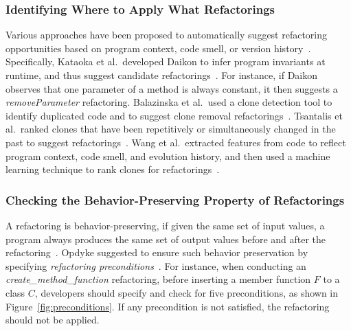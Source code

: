 \documentclass[runningheads,a4paper]{llncs}
\begin{document}
\subsubsection{Identifying Where to Apply What Refactorings}
Various approaches have been proposed to automatically suggest refactoring opportunities based on program context, code smell, or version history~\cite{Balazinska2000:ACA,Kataoka2001:ASP,Higo2008:metricrefactoring,Tsantalis2011:rankRefactoring,Wang2014:recommendClones,Meng2015:ARO}. Specifically, Kataoka et al.~developed Daikon to infer program invariants at runtime, and thus suggest candidate refactorings~\cite{Kataoka2001:ASP}. For instance, if Daikon observes that one parameter of a method is always constant, it then suggests a \emph{removeParameter} refactoring. Balazinska et al.~used a clone detection tool to identify duplicated code and to suggest clone removal refactorings~\cite{Balazinska2000:ACA}. Tsantalis et al.~ranked clones that have been repetitively or simultaneously changed in the past to suggest refactorings~\cite{Tsantalis2011:rankRefactoring}. Wang et al.~extracted features from code to reflect program context, code smell, and evolution history, and then used a machine learning technique to rank clones for refactorings~\cite{Wang2014:recommendClones}.

\subsubsection{Checking the Behavior-Preserving Property of Refactorings}
A refactoring is behavior-preserving, if given the same set of input values, a program always produces the same set of output values before and after the refactoring~\cite{Opdyke1992:ROF}. Opdyke suggested to ensure such behavior preservation by specifying \emph{refactoring preconditions}~\cite{Opdyke1992:ROF}. For instance, when conducting an \emph{create\_method\_function} refactoring, before inserting a member function $F$ to a class $C$, developers should specify and check for five preconditions, as shown in Figure~\ref{fig:preconditions}. If any precondition is not satisfied, the refactoring should not be applied.
\end{document}
